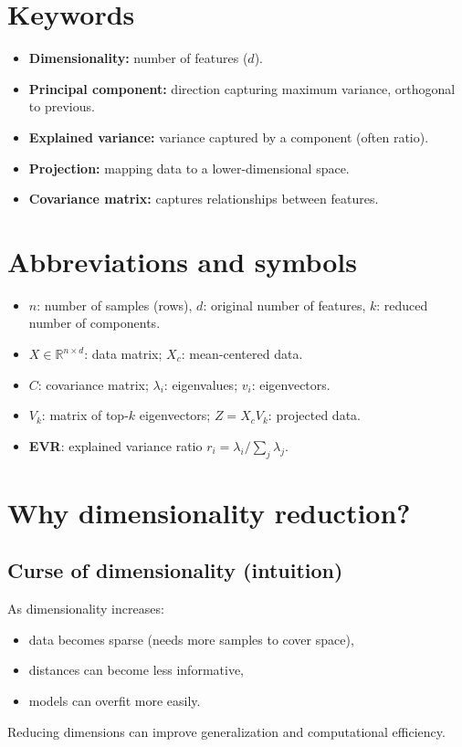 \documentclass[11pt]{article}
\begin{document}
\section{Keywords}
\begin{itemize}[leftmargin=*]
  \item \textbf{Dimensionality:} number of features ($d$).
  \item \textbf{Principal component:} direction capturing maximum variance, orthogonal to previous.
  \item \textbf{Explained variance:} variance captured by a component (often ratio).
  \item \textbf{Projection:} mapping data to a lower-dimensional space.
  \item \textbf{Covariance matrix:} captures relationships between features.
\end{itemize}

\section{Abbreviations and symbols}
\begin{itemize}[leftmargin=*]
  \item $n$: number of samples (rows), $d$: original number of features, $k$: reduced number of components.
  \item $X \in \mathbb{R}^{n \times d}$: data matrix; $X_c$: mean-centered data.
  \item $C$: covariance matrix; $\lambda_i$: eigenvalues; $v_i$: eigenvectors.
  \item $V_k$: matrix of top-$k$ eigenvectors; $Z = X_c V_k$: projected data.
  \item \textbf{EVR}: explained variance ratio $r_i = \lambda_i / \sum_j \lambda_j$.
\end{itemize}

\section{Why dimensionality reduction?}
\subsection{Curse of dimensionality (intuition)}
As dimensionality increases:
\begin{itemize}[leftmargin=*]
  \item data becomes sparse (needs more samples to cover space),
  \item distances can become less informative,
  \item models can overfit more easily.
\end{itemize}
Reducing dimensions can improve generalization and computational efficiency.
\end{document}
